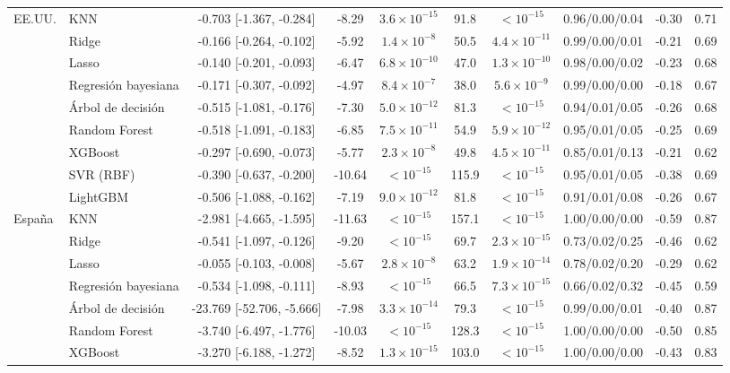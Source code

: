 \begin{longtable}{llcccccccc}
\midrule
EE.UU. & KNN & -0.703 [-1.367, -0.284] & -8.29 & $3.6\times10^{-15}$ & 91.8 & $<10^{-15}$ & 0.96/0.00/0.04 & -0.30 & 0.71 \\
 & Ridge & -0.166 [-0.264, -0.102] & -5.92 & $1.4\times10^{-8}$ & 50.5 & $4.4\times10^{-11}$ & 0.99/0.00/0.01 & -0.21 & 0.69 \\
 & Lasso & -0.140 [-0.201, -0.093] & -6.47 & $6.8\times10^{-10}$ & 47.0 & $1.3\times10^{-10}$ & 0.98/0.00/0.02 & -0.23 & 0.68 \\
 & Regresión bayesiana & -0.171 [-0.307, -0.092] & -4.97 & $8.4\times10^{-7}$ & 38.0 & $5.6\times10^{-9}$ & 0.99/0.00/0.00 & -0.18 & 0.67 \\
 & Árbol de decisión & -0.515 [-1.081, -0.176] & -7.30 & $5.0\times10^{-12}$ & 81.3 & $<10^{-15}$ & 0.94/0.01/0.05 & -0.26 & 0.68 \\
 & Random Forest & -0.518 [-1.091, -0.183] & -6.85 & $7.5\times10^{-11}$ & 54.9 & $5.9\times10^{-12}$ & 0.95/0.01/0.05 & -0.25 & 0.69 \\
 & XGBoost & -0.297 [-0.690, -0.073] & -5.77 & $2.3\times10^{-8}$ & 49.8 & $4.5\times10^{-11}$ & 0.85/0.01/0.13 & -0.21 & 0.62 \\
 & SVR (RBF) & -0.390 [-0.637, -0.200] & -10.64 & $<10^{-15}$ & 115.9 & $<10^{-15}$ & 0.95/0.01/0.05 & -0.38 & 0.69 \\
 & LightGBM & -0.506 [-1.088, -0.162] & -7.19 & $9.0\times10^{-12}$ & 81.8 & $<10^{-15}$ & 0.91/0.01/0.08 & -0.26 & 0.67 \\
\midrule
España & KNN & -2.981 [-4.665, -1.595] & -11.63 & $<10^{-15}$ & 157.1 & $<10^{-15}$ & 1.00/0.00/0.00 & -0.59 & 0.87 \\
 & Ridge & -0.541 [-1.097, -0.126] & -9.20 & $<10^{-15}$ & 69.7 & $2.3\times10^{-15}$ & 0.73/0.02/0.25 & -0.46 & 0.62 \\
 & Lasso & -0.055 [-0.103, -0.008] & -5.67 & $2.8\times10^{-8}$ & 63.2 & $1.9\times10^{-14}$ & 0.78/0.02/0.20 & -0.29 & 0.62 \\
 & Regresión bayesiana & -0.534 [-1.098, -0.111] & -8.93 & $<10^{-15}$ & 66.5 & $7.3\times10^{-15}$ & 0.66/0.02/0.32 & -0.45 & 0.59 \\
 & Árbol de decisión & -23.769 [-52.706, -5.666] & -7.98 & $3.3\times10^{-14}$ & 79.3 & $<10^{-15}$ & 0.99/0.00/0.01 & -0.40 & 0.87 \\
 & Random Forest & -3.740 [-6.497, -1.776] & -10.03 & $<10^{-15}$ & 128.3 & $<10^{-15}$ & 1.00/0.00/0.00 & -0.50 & 0.85 \\
 & XGBoost & -3.270 [-6.188, -1.272] & -8.52 & $1.3\times10^{-15}$ & 103.0 & $<10^{-15}$ & 1.00/0.00/0.00 & -0.43 & 0.83 \\

\end{longtable}
